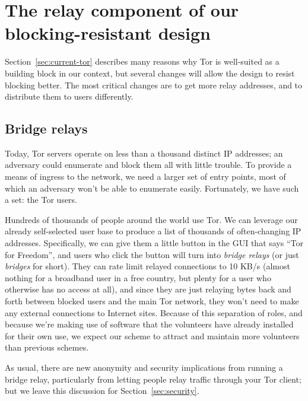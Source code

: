 \documentclass{llncs}
\begin{document}
\section{The relay component of our blocking-resistant design}
\label{sec:bridges}

Section~\ref{sec:current-tor} describes many reasons why Tor is
well-suited as a building block in our context, but several changes will
allow the design to resist blocking better. The most critical changes are
to get more relay addresses, and to distribute them to users differently.



\subsection{Bridge relays}

Today, Tor servers operate on less than a thousand distinct IP addresses;
an adversary
could enumerate and block them all with little trouble.  To provide a
means of ingress to the network, we need a larger set of entry points, most
of which an adversary won't be able to enumerate easily.  Fortunately, we
have such a set: the Tor users.

Hundreds of thousands of people around the world use Tor. We can leverage
our already self-selected user base to produce a list of thousands of
often-changing IP addresses. Specifically, we can give them a little
button in the GUI that says ``Tor for Freedom'', and users who click
the button will turn into \emph{bridge relays} (or just \emph{bridges}
for short). They can rate limit relayed connections to 10 KB/s (almost
nothing for a broadband user in a free country, but plenty for a user
who otherwise has no access at all), and since they are just relaying
bytes back and forth between blocked users and the main Tor network, they
won't need to make any external connections to Internet sites. Because
of this separation of roles, and because we're making use of software
that the volunteers have already installed for their own use, we expect
our scheme to attract and maintain more volunteers than previous schemes.

As usual, there are new anonymity and security implications from running a
bridge relay, particularly from letting people relay traffic through your
Tor client; but we leave this discussion for Section~\ref{sec:security}.
\end{document}
